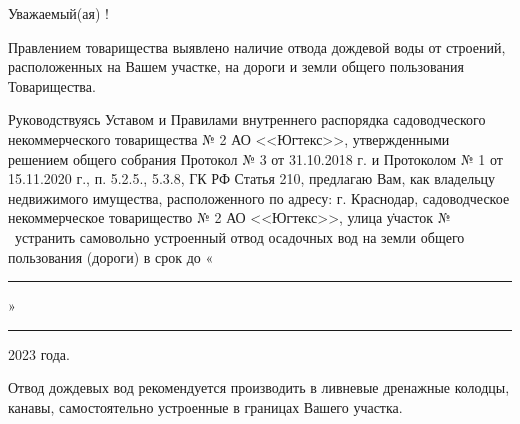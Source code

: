 \begin{center}
	Уважаемый(ая) \textbf{ }!
\end{center}
\vspace{-3mm}
Правлением товарищества выявлено наличие  отвода дождевой воды  от строений, расположенных на Вашем участке, на дороги и земли общего пользования  Товарищества.  


Руководствуясь Уставом и  Правилами внутреннего распорядка садоводческого некоммерческого товарищества  № 2 АО <<Югтекс>>, утвержденными решением общего собрания Протокол № 3 от 31.10.2018 г. и Протоколом № 1 от 15.11.2020 г., п. 5.2.5.,  5.3.8,  ГК РФ Статья 210,  предлагаю  Вам, как владельцу недвижимого имущества, расположенного по адресу: г. Краснодар, садоводческое некоммерческое товарищество № 2 АО <<Югтекс>>,    улица \textbf{} \. участок №~\textbf{} \ устранить самовольно устроенный отвод осадочных вод на  земли общего пользования (дороги) в срок  до %
«\rule{10mm}{0.1 mm}»\rule{35mm}{0.1 mm} 2023 года.  

Отвод  дождевых вод рекомендуется производить в ливневые дренажные колодцы, канавы, самостоятельно устроенные в границах Вашего участка. 


%



